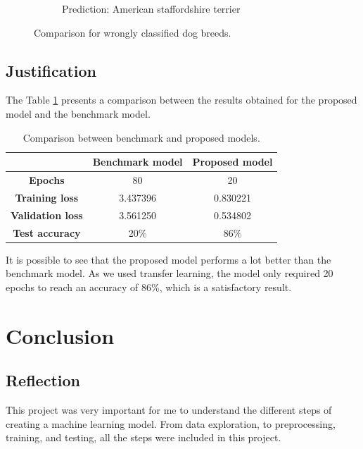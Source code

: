 \documentclass{article}
\begin{document}
\begin{figure}[htbp]
\begin{subfigure}{.45\textwidth}
            \caption{Prediction: American staffordshire terrier}
            \label{fig:american_staffy}
        \end{subfigure}
        \caption{Comparison for wrongly classified dog breeds.}
        \label{fig:comparison_wrong}
    \end{figure}

    \subsection{Justification}

    The Table \ref{tab:results_comparison} presents a comparison between the results obtained for the proposed model and the benchmark model.

    \begin{table}[htbp]
        \centering
        \begin{tabular}{c|c|c}
             & \textbf{Benchmark model} & \textbf{Proposed model} \\
            \hline
            \textbf{Epochs} & 80 & 20 \\
            \textbf{Training loss} & 3.437396 & 0.830221 \\
            \textbf{Validation loss} & 3.561250 & 0.534802 \\
            \textbf{Test accuracy} & 20\% & 86\% \\
        \end{tabular}
        \caption{Comparison between benchmark and proposed models.}
        \label{tab:results_comparison}
    \end{table}

    It is possible to see that the proposed model performs a lot better than the benchmark model. As we used transfer learning, the model only required 20 epochs to reach an accuracy of 86\%, which is a satisfactory result.

    \section{Conclusion}

    \subsection{Reflection}

    This project was very important for me to understand the different steps of creating a machine learning model. From data exploration, to preprocessing, training, and testing, all the steps were included in this project.
\end{document}

